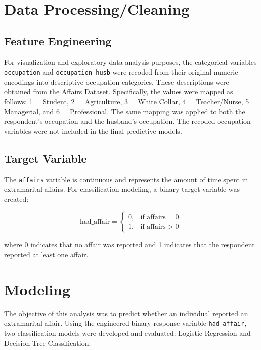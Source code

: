 \documentclass[12pt]{article}
\begin{document}
\section{Data Processing/Cleaning}

\subsection{Feature Engineering}

For visualization and exploratory data analysis purposes, the categorical variables \texttt{occupation} and \texttt{occupation\_husb} were recoded from their original numeric encodings into descriptive occupation categories. These descriptions were obtained from the \href{https://www.statsmodels.org/dev/datasets/generated/fair.html}
{Affairs Dataset}. Specifically, the values were mapped as follows: 1 = Student, 2 = Agriculture, 3 = White Collar, 4 = Teacher/Nurse, 5 = Managerial, and 6 = Professional. The same mapping was applied to both the respondent's occupation and the husband's occupation. The recoded occupation variables were not included in the final predictive models.

\subsection{Target Variable}
The \texttt{affairs} variable is continuous and represents the amount of time spent in extramarital affairs. For classification modeling, a binary target variable was created:

\[
\mathrm{had\_affair} =
\begin{cases}
0, & \text{if affairs} = 0 \\
1, & \text{if affairs} > 0
\end{cases}
\]

where 0 indicates that no affair was reported and 1 indicates that the respondent reported at least one affair.



\section{Modeling}

The objective of this analysis was to predict whether an individual reported an extramarital affair. Using the engineered binary response variable \verb|had_affair|, two classification models were developed and evaluated: Logistic Regression and Decision Tree Classification.
\end{document}
